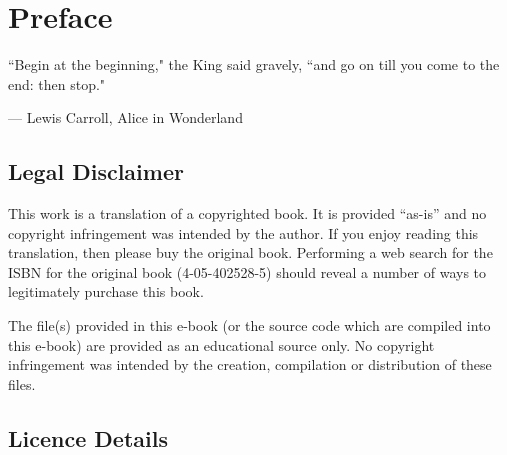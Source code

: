 
\pagestyle{fancy}

\renewcommand{\chaptermark}[1]{%
\markboth{#1}{}}
\renewcommand{\sectionmark}[1]{%
\markright{\thesection\ #1}}
\fancyhf{} %
\fancyhead[LE,RO]{\bfseries\thepage}
\fancyhead[LO]{\bfseries\rightmark}
\fancyhead[RE]{\bfseries\leftmark}
\renewcommand{\headrulewidth}{0.5pt}
\renewcommand{\footrulewidth}{0pt}
\addtolength{\headheight}{0.5pt} %
\fancypagestyle{plain}{%
\fancyhead{} %
\renewcommand{\headrulewidth}{0pt} %
}

\setcounter{footnote}{0}
\setcounter{endnote}{0}

\chapter*{Preface}

\epigraph{``Begin at the beginning," the King said gravely, ``and go on till you come to the end: then stop."}{--- \textup{Lewis Carroll}, Alice in Wonderland}

\section*{Legal Disclaimer}
This work is a translation of a copyrighted book. It is provided ``as-is'' and no copyright infringement was intended by the author. If you enjoy reading this translation, then please buy the original book. Performing a web search for the ISBN for the original book (4-05-402528-5) should reveal a number of ways to legitimately purchase this book.

\par The file(s) provided in this e-book (or the source code which are compiled into this e-book) are provided as an educational source only. No copyright infringement was intended by the creation, compilation or distribution of these files.

\section*{Licence Details}


